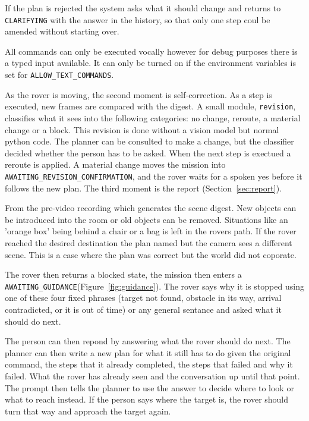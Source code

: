 If the plan is rejected the system asks what it should change and returns to \texttt{CLARIFYING} with the answer in
the history, so that only one step coul be amended without starting over.

All commands can only be executed vocally however for debug purposes there is a typed input available. It can only be turned on if the 
environment variables is set for \texttt{ALLOW\_TEXT\_COMMANDS}. 

\label{ssec:revision}

As the rover is moving, the second moment is self-correction. As a step is executed, new frames are compared with the digest.
A small module, \texttt{revision}, classifies what it sees into the following categories: no change, reroute, a material change or a 
block. This revision is done without a vision model but normal python code. The planner can be consulted to make a change,
but the classifier decided whether the person has to be asked. When the next step is exectued a reroute is applied. A material change moves the mission into
\texttt{AWAITING\_REVISION\_CONFIRMATION}, and the rover waits for a spoken yes
before it follows the new plan. The third moment is the report
(Section~\ref{sec:report}).

\label{sec:recovery}

From the pre-video recording which generates the scene digest. New objects can be introduced into the room or 
old objects can be removed. Situations like an 'orange box' being behind a chair or a bag is left in the rovers path. 
If the rover reached the desired destination the plan named but the camera sees a different scene. This is a case where the plan was 
correct but the world did not coporate.

The rover then returns a blocked state, the mission then enters a \texttt{AWAITING\_GUIDANCE}(Figure~\ref{fig:guidance}).
The rover says why it is stopped using one of these four fixed phrases (target not found, obstacle in its way, arrival contradicted, or it is out of time)
or any general sentance and asked what it should do next. 

The person can then repond by answering what the rover should do next.  The planner can then write a new plan for what 
it still has to do given  the original command, the steps that it already completed, the steps that failed and why it failed. What the rover
has already seen and the conversation up until that point. The prompt then tells the planner to use the answer to decide 
where to look or what to reach instead. If the person says where the target is, the rover should turn that way and approach the target again.

